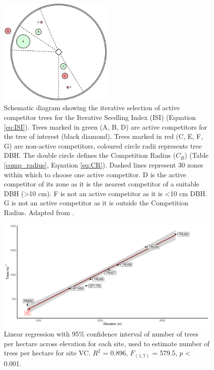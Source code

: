 \documentclass[a4paper, 11pt]{article}
\begin{document}
\begin{figure}[H]
\includegraphics[width=0.5\textwidth]{hegyi}
\centering
\caption{Schematic diagram showing the iterative selection of active competitor trees for the Iterative Seedling Index (ISI) (Equation \ref{eq:ISI}). Trees marked in green (A, B, D) are active competitors for the tree of interest (black diamond). Trees marked in red (C, E, F, G) are non-active competitors, coloured circle radii represents tree DBH. The double circle defines the Competition Radius ($C_R$) (Table \ref{comp_radius}, Equation \ref{eq:CR}). Dashed lines represent 30\textdegree{} zones within which to choose one active competitor. D is the active competitor of its zone as it is the nearest competitor of a suitable DBH (\textgreater{}10 cm). F is not an active competitor as it is \textless{}10 cm DBH. G is not an active competitor as it is outside the Competition Radius. Adapted from \citet{Lee2004}.}
\label{hegyi}
\end{figure}

\begin{figure}[H]
\includegraphics[width=\textwidth]{comp_radius_fit}
\centering
\caption{Linear regression with 95\% confidence interval of number of trees per hectare across elevation for each site, used to estimate number of trees per hectare for site VC. $R^2$ = 0.896, $F_{(1,7)}$ = 579.5, $p$ \textless{} 0.001.}
\label{comp_radius_fit}
\end{figure}
\end{document}
